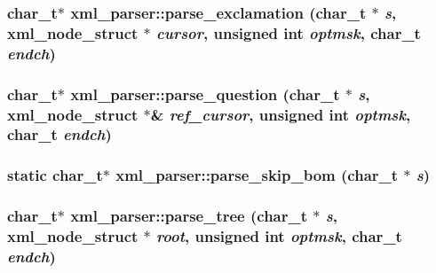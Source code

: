 \hypertarget{structxml__parser_40da52e4b27a0a06752930a0edf16fe9}{
\subsubsection[parse\_\-exclamation]{\setlength{\rightskip}{0pt plus 5cm}char\_\-t$\ast$ xml\_\-parser::parse\_\-exclamation (char\_\-t $\ast$ {\em s}, xml\_\-node\_\-struct $\ast$ {\em cursor}, unsigned int {\em optmsk}, char\_\-t {\em endch})}}
\label{structxml__parser_40da52e4b27a0a06752930a0edf16fe9}


\hypertarget{structxml__parser_2b0edc4fbf2ff448b4d5b31593c5c4fd}{
\subsubsection[parse\_\-question]{\setlength{\rightskip}{0pt plus 5cm}char\_\-t$\ast$ xml\_\-parser::parse\_\-question (char\_\-t $\ast$ {\em s}, xml\_\-node\_\-struct $\ast$\& {\em ref\_\-cursor}, unsigned int {\em optmsk}, char\_\-t {\em endch})}}
\label{structxml__parser_2b0edc4fbf2ff448b4d5b31593c5c4fd}


\hypertarget{structxml__parser_f0a3f5a488b05da9fa2c87e1dd1f9eda}{
\subsubsection[parse\_\-skip\_\-bom]{\setlength{\rightskip}{0pt plus 5cm}static char\_\-t$\ast$ xml\_\-parser::parse\_\-skip\_\-bom (char\_\-t $\ast$ {\em s})}}
\label{structxml__parser_f0a3f5a488b05da9fa2c87e1dd1f9eda}


\hypertarget{structxml__parser_96e76ebea8834b3e56e1c8646e593da4}{
\subsubsection[parse\_\-tree]{\setlength{\rightskip}{0pt plus 5cm}char\_\-t$\ast$ xml\_\-parser::parse\_\-tree (char\_\-t $\ast$ {\em s}, xml\_\-node\_\-struct $\ast$ {\em root}, unsigned int {\em optmsk}, char\_\-t {\em endch})}}
\label{structxml__parser_96e76ebea8834b3e56e1c8646e593da4}




